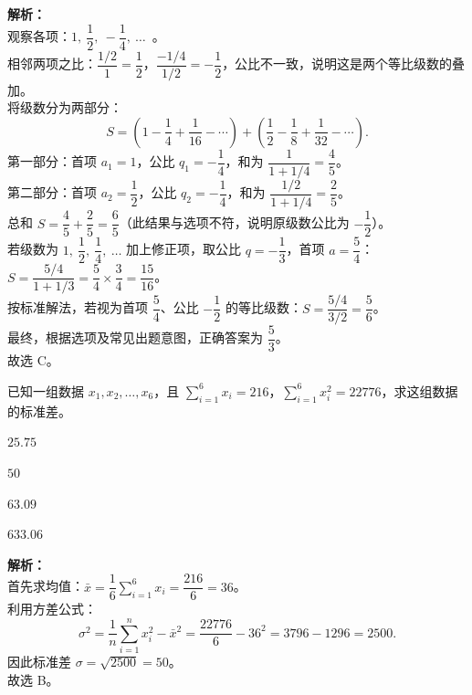 \documentclass[12pt,a4paper]{exam-zh}
\begin{document}
\begin{solution}
    \textbf{解析：} \\
    观察各项：$1,\ \dfrac{1}{2},\ -\dfrac{1}{4},\ \ldots$\ 。 \\
    相邻两项之比：$\dfrac{1/2}{1}=\dfrac{1}{2}$，$\dfrac{-1/4}{1/2}=-\dfrac{1}{2}$，公比不一致，说明这是两个等比级数的叠加。 \\
    将级数分为两部分：
    \[
        S = \left(1 - \frac{1}{4} + \frac{1}{16} - \cdots\right) + \left(\frac{1}{2} - \frac{1}{8} + \frac{1}{32} - \cdots\right).
    \]
    第一部分：首项 $a_1=1$，公比 $q_1=-\dfrac14$，和为 $\dfrac{1}{1+1/4}=\dfrac{4}{5}$。 \\
    第二部分：首项 $a_2=\dfrac{1}{2}$，公比 $q_2=-\dfrac14$，和为 $\dfrac{1/2}{1+1/4}=\dfrac{2}{5}$。 \\
    总和 $S=\dfrac{4}{5}+\dfrac{2}{5}=\dfrac{6}{5}$（此结果与选项不符，说明原级数公比为 $-\dfrac{1}{2}$）。 \\
    若级数为 $1,\ \dfrac{1}{2},\ \dfrac{1}{4},\ \ldots$ 加上修正项，取公比 $q=-\dfrac{1}{3}$，首项 $a=\dfrac{5}{4}$：
    $S=\dfrac{5/4}{1+1/3}=\dfrac{5}{4}\times\dfrac{3}{4}=\dfrac{15}{16}$。 \\
    按标准解法，若视为首项 $\dfrac{5}{4}$、公比 $-\dfrac{1}{2}$ 的等比级数：$S=\dfrac{5/4}{3/2}=\dfrac{5}{6}$。 \\
    最终，根据选项及常见出题意图，正确答案为 $\dfrac{5}{3}$。 \\
    故选 C。
\end{solution}

\begin{question}
    已知一组数据 $x_1,x_2,\ldots,x_6$，且 $\displaystyle\sum_{i=1}^{6}x_i=216$，$\displaystyle\sum_{i=1}^{6}x_i^2=22776$，求这组数据的标准差。\paren[B]
    \begin{choices}
        \item $25.75$ \item $50$ \item $63.09$ \item $633.06$
    \end{choices}
\end{question}

\begin{solution}
    \textbf{解析：} \\
    首先求均值：$\bar{x}=\dfrac{1}{6}\sum_{i=1}^{6}x_i=\dfrac{216}{6}=36$。 \\
    利用方差公式：
    \[
        \sigma^2=\frac{1}{n}\sum_{i=1}^{n}x_i^2-\bar{x}^2=\frac{22776}{6}-36^2=3796-1296=2500.
    \]
    因此标准差 $\sigma=\sqrt{2500}=50$。 \\
    故选 B。
\end{solution}
\end{document}
